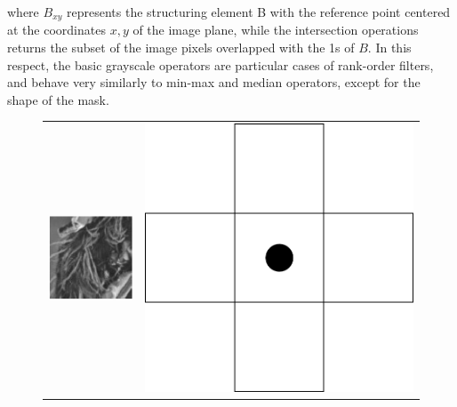 \documentclass[review]{elsarticle}
\begin{document}
where $B_{xy}$ represents the structuring element B with the reference point centered at the coordinates $x,y$ of the image plane, while the intersection operations returns the subset of the image pixels overlapped with the 1s of $B$. In this respect, the basic grayscale operators are particular cases of rank-order filters, and behave very similarly to min-max and median operators, except for the shape of the mask.

\begin{figure}[h!]
	\centering
	\begin{tabular}{cc}
		\centering
		\includegraphics[scale=1]{original.eps} & \includegraphics[scale=0.1]{mask.png} \\

\end{tabular}
\end{figure}
\end{document}
